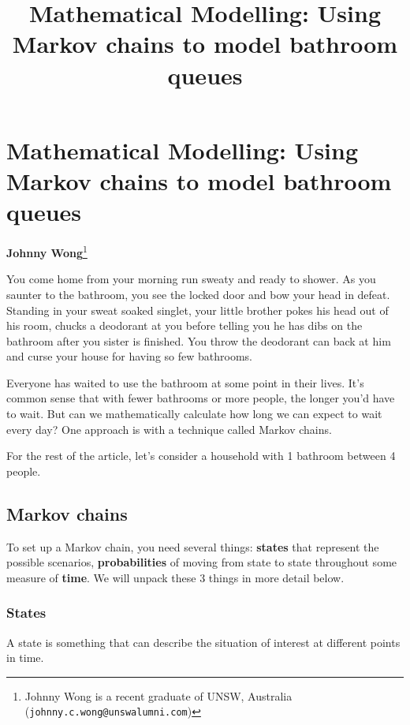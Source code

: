 \usetikzlibrary{automata, positioning}



\section*{Mathematical Modelling: Using Markov chains to model bathroom queues}
\vspace{-.30cm}

\title{Mathematical Modelling: Using Markov chains to model bathroom queues}

\begin{center}
	\textbf{Johnny Wong}\footnote{%
		Johnny Wong is a recent graduate of UNSW, Australia ({\tt johnny.c.wong@unswalumni.com})}
\end{center}

\vspace{5mm}

You come home from your morning run sweaty and ready to shower. As you saunter to the bathroom, you see the locked door and bow your head in defeat. Standing in your sweat soaked singlet, your little brother pokes his head out of his room, chucks a deodorant at you before telling you he has dibs on the bathroom after you sister is finished. You throw the deodorant can back at him and curse your house for having so few bathrooms.

Everyone has waited to use the bathroom at some point in their lives. It's common sense that with fewer bathrooms or more people, the longer you'd have to wait. But can we mathematically calculate how long we can expect to wait every day? One approach is with a technique called Markov chains.

For the rest of the article, let's consider a household with 1 bathroom between 4 people.

\subsection*{Markov chains}
To set up a Markov chain, you need several things: \textbf{states} that represent the possible scenarios, \textbf{probabilities} of moving from state to state throughout some measure of \textbf{time}. We will unpack these 3 things in more detail below.

\subsubsection*{States}
A state is something that can describe the situation of interest at different points in time.

